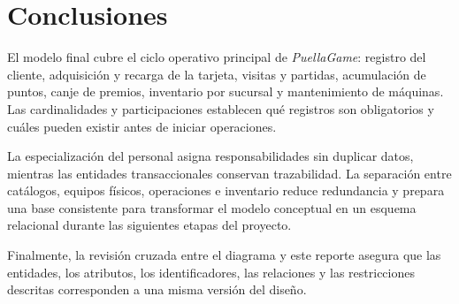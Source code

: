 \section{Conclusiones}

El modelo final cubre el ciclo operativo principal de \textit{PuellaGame}:
registro del cliente, adquisición y recarga de la tarjeta, visitas y partidas,
acumulación de puntos, canje de premios, inventario por sucursal y
mantenimiento de máquinas. Las cardinalidades y participaciones establecen qué
registros son obligatorios y cuáles pueden existir antes de iniciar operaciones.

La especialización del personal asigna responsabilidades sin duplicar datos,
mientras las entidades transaccionales conservan trazabilidad. La separación
entre catálogos, equipos físicos, operaciones e inventario reduce redundancia y
prepara una base consistente para transformar el modelo conceptual en un
esquema relacional durante las siguientes etapas del proyecto.

Finalmente, la revisión cruzada entre el diagrama y este reporte asegura que
las entidades, los atributos, los identificadores, las relaciones y las
restricciones descritas corresponden a una misma versión del diseño.
